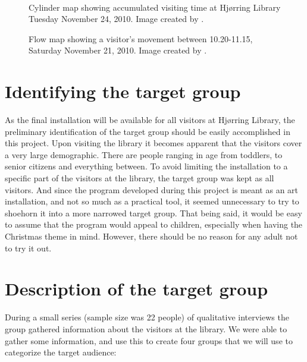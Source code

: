 \begin{figure}[htbp]
\begin{minipage}[b]{0.45\textwidth}
\end{minipage} \\ %
\begin{minipage}[t]{0.45\textwidth}
\caption{Cylinder map showing accumulated visiting time at Hj{\o}rring Library Tuesday November 24, 2010. Image created by \citep{hjoerring_study}.} %
\label{fig:library_cylindermap}
\end{minipage} \hfill
\begin{minipage}[t]{0.45\textwidth}
\caption{Flow map showing a visitor's movement between 10.20-11.15, Saturday November 21, 2010. Image created by \citep{hjoerring_study}.} %
\label{fig:library_flowmap}
\end{minipage}
\end{figure}

\section{Identifying the target group}
As the final installation will be available for all visitors at Hj{\o}rring Library, the preliminary identification of the target group should be easily accomplished in this project. Upon visiting the library it becomes apparent that the visitors cover a very large demographic. There are people ranging in age from toddlers, to senior citizens and everything between. To avoid limiting the installation to a specific part of the visitors at the library, the target group was kept as all visitors. And since the program developed during this project is meant as an art installation, and not so much as a practical tool, it seemed unnecessary to try to shoehorn it into a more narrowed target group. That being said, it would be easy to assume that the program would appeal to children, especially when having the Christmas theme in mind. However, there should be no reason for any adult not to try it out.

\section{Description of the target group}
During a small series (sample size was 22 people) of qualitative interviews the group gathered information about the visitors at the library. We were able to gather some information, and use this to create four groups that we will use to categorize the target audience:

